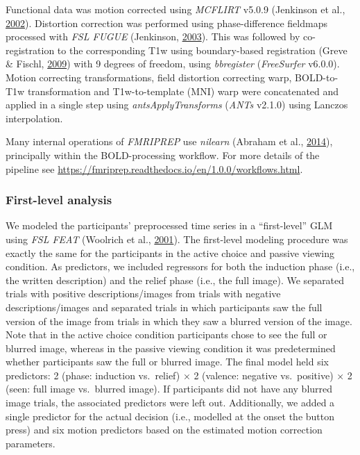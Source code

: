 \documentclass[12pt,american,a4paper,oneside,]{memoir} %
\begin{document}
Functional data was motion corrected using \emph{MCFLIRT} v5.0.9 (Jenkinson et al., \protect\hyperlink{ref-Jenkinson2002-wm}{2002}). Distortion correction was performed using phase-difference fieldmaps processed with \emph{FSL FUGUE} (Jenkinson, \protect\hyperlink{ref-jenkinson2003fast}{2003}). This was followed by co-registration to the corresponding T1w using boundary-based registration (Greve \& Fischl, \protect\hyperlink{ref-Greve2009-da}{2009}) with 9 degrees of freedom, using \emph{bbregister} (\emph{FreeSurfer} v6.0.0). Motion correcting transformations, field distortion correcting warp, BOLD-to-T1w transformation and T1w-to-template (MNI) warp were concatenated and applied in a single step using \emph{antsApplyTransforms} (\emph{ANTs} v2.1.0) using Lanczos interpolation.

Many internal operations of \emph{FMRIPREP} use \emph{nilearn} (Abraham et al., \protect\hyperlink{ref-Abraham2014-ef}{2014}), principally within the BOLD-processing workflow. For more details of the pipeline see \url{https://fmriprep.readthedocs.io/en/1.0.0/workflows.html}.

\hypertarget{morbid-curiosity-methods-imaging-first-level-analysis}{%
\subsubsection{First-level analysis}\label{morbid-curiosity-methods-imaging-first-level-analysis}}

We modeled the participants' preprocessed time series in a ``first-level'' GLM using \emph{FSL FEAT} (Woolrich et al., \protect\hyperlink{ref-woolrich2001temporal}{2001}). The first-level modeling procedure was exactly the same for the participants in the active choice and passive viewing condition. As predictors, we included regressors for both the induction phase (i.e., the written description) and the relief phase (i.e., the full image). We separated trials with positive descriptions/images from trials with negative descriptions/images and separated trials in which participants saw the full version of the image from trials in which they saw a blurred version of the image. Note that in the active choice condition participants chose to see the full or blurred image, whereas in the passive viewing condition it was predetermined whether participants saw the full or blurred image. The final model held six predictors: 2 (phase: induction vs.~relief) × 2 (valence: negative vs.~positive) × 2 (seen: full image vs.~blurred image). If participants did not have any blurred image trials, the associated predictors were left out. Additionally, we added a single predictor for the actual decision (i.e., modelled at the onset the button press) and six motion predictors based on the estimated motion correction parameters.
\end{document}
